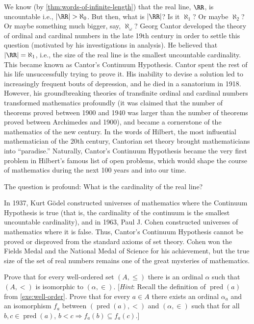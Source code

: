 We know (by \cref{thm:words-of-infinite-length}) that the real line, $\RR$, is uncountable i.e., $|\RR|>\aleph_0$.
But then, what is $|\RR|$?
Is it $\aleph_1$?
Or maybe  $\aleph_2$?
Or maybe something much bigger, say, $\aleph_\omega$?
Georg Cantor developed  the theory of ordinal and cardinal numbers in the late 19th century in order  to settle this question (motivated by his investigations in analysis).
He believed that $|\RR|=\aleph_1$, i.e., the size of the real line is the smallest uncountable cardinality.
This became known as Cantor’s Continuum Hypothesis.
Cantor spent the rest of his life unsuccessfully trying to prove it.
His inability to devise a solution led to increasingly frequent bouts  of depression, and he died in a sanatorium in 1918. However, his groundbreaking theories of transfinite ordinal and cardinal numbers transformed mathematics profoundly
(it was claimed that the number of theorems proved between 1900 and 1940 was larger than the number of theorems proved between Archimedes and 1900), and became a cornerstone of the mathematics of the new century.
In the words of Hilbert, the most influential mathematician of the 20th century,
Cantorian set theory brought mathematicians into “paradise.”  Naturally,
Cantor’s Continuum Hypothesis  became the very first problem in Hilbert’s  famous list of open problems, which would shape the course of mathematics during the next 100 years and into our time.

The question is profound:
What is the cardinality of the real line?

In 1937, Kurt Gödel constructed universes of mathematics where the Continuum Hypothesis is true
(that is, the cardinality of the continuum is the smallest uncountable cardinality), and in 1963, Paul J. Cohen constructed universes of mathematics where it is false.
Thus, Cantor’s Continuum Hypothesis cannot be proved or disproved from the standard axioms of set theory.
Cohen won the Fields Medal and the National Medal of Science for his achievement, but the true size of the set of real numbers remains one of the great mysteries of mathematics.

\begin{exercise}
  \label{exe:well-order-isomorphic-to-ordinal}
  Prove that for every well-ordered set $(A,\le)$ there is an ordinal $\alpha$ such that $(A,<)$ is isomorphic to $(\alpha,\in)$.
    [\emph{Hint}:
      Recall the definition of $\operatorname{pred}(a)$ from \cref{exe:well-order}.
      Prove that for every $a\in A$ there exists an ordinal $\alpha_a$ and an isomorphism $f_a$ between $(\operatorname{pred}(a),<)$ and $(\alpha,\in)$ such that for all $b,c\in \operatorname{pred}(a)$, $b<c\Rightarrow f_a(b)\subseteq f_a(c)$.]
\end{exercise}

